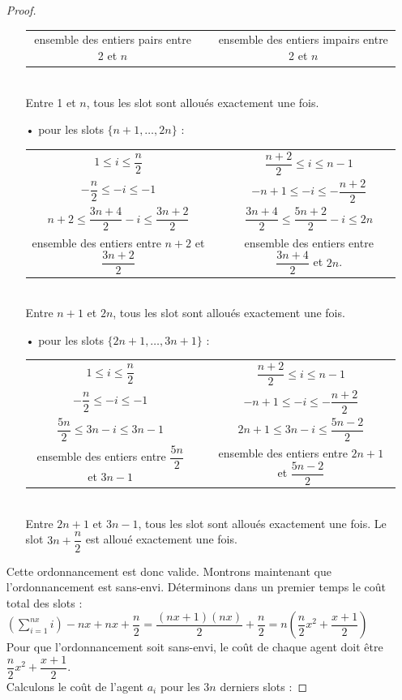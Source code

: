 \documentclass[12pt]{article}
\theoremstyle{definition}
\begin{document}
\begin{itemize}
\begin{proof}
\begin{itemize}
\begin{tabular}{ccc}
ensemble des entiers pairs entre 2 et $n$ & & ensemble des entiers impairs entre 2 et $n$
\end{tabular}\\
Entre 1 et $n$, tous les slot sont alloués exactement une fois.
\item[•] pour les slots $\{n+1,\dots,2n\}$ :\\
\begin{tabular}{ccc}
$1\leq i \leq \dfrac{n}{2}$ & & $\dfrac{n+2}{2}\leq i \leq n-1$\\
$-\dfrac{n}{2}\leq -i\leq -1$ & & $-n+1\leq -i \leq -\dfrac{n+2}{2}$\\
$n+2 \leq \dfrac{3n+4}{2}-i\leq\dfrac{3n+2}{2}$ & & $\dfrac{3n+4}{2}\leq \dfrac{5n+2}{2}-i\leq 2n$\\
ensemble des entiers entre $n+2$ et $\dfrac{3n+2}{2}$ & & ensemble des entiers entre $\dfrac{3n+4}{2}$ et $2n$. 
\end{tabular}\\
Entre $n+1$ et $2n$, tous les slot sont alloués exactement une fois.
\item[•] pour les slots $\{2n+1,\dots,3n + 1\}$ :\\
\begin{tabular}{ccc}
$1\leq i \leq \dfrac{n}{2}$ & & $\dfrac{n+2}{2}\leq i \leq n-1$\\
$-\dfrac{n}{2}\leq -i\leq -1$ & & $-n+1\leq -i \leq -\dfrac{n+2}{2}$\\
$\dfrac{5n}{2}\leq 3n-i\leq 3n-1$ & & $2n+1\leq 3n-i \leq \dfrac{5n-2}{2}$\\
ensemble des entiers entre $\dfrac{5n}{2}$ et $3n-1$ & & ensemble des entiers entre $2n + 1$ et $\dfrac{5n-2}{2}$
\end{tabular}\\
Entre $2n+1$ et $3n-1$, tous les slot sont alloués exactement une fois. Le slot $3n + \dfrac{n}{2}$ est alloué exactement une fois.\\
\end{itemize}
Cette ordonnancement est donc valide. Montrons maintenant que l'ordonnancement est sans-envi. Déterminons dans un premier temps le coût total des slots :\\
$(\sum\limits_{i=1}^{nx}i)-nx+nx+\dfrac{n}{2} = \dfrac{(nx+1)(nx)}{2}+\dfrac{n}{2} = n(\dfrac{n}{2}x^2+\dfrac{x+1}{2})$\\
Pour que l'ordonnancement soit sans-envi, le coût de chaque agent doit être $\dfrac{n}{2}x^2+\dfrac{x+1}{2}$.\\
Calculons le coût de l'agent $a_i$ pour les $3n$ derniers slots :

\end{proof}
\end{itemize}
\end{document}
